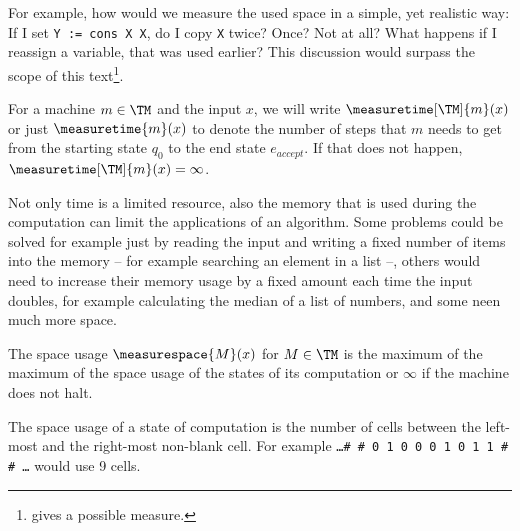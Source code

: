 For example, how would we measure the used space in a simple, yet realistic
way: If I set {\tt Y := cons X X}, do I copy {\tt X} twice? Once?  Not at all?
What happens if I reassign a variable, that was used earlier?  This discussion
would surpass the scope of this text\footnote{\cite[p. 325f]{jones} gives a
possible measure.}.

\begin{defn}
	For a machine $m\in \TM$ and the input $x$, we will write 
	$\measuretime[\TM]{m}(x)$ or just $\measuretime{m}(x)$ to denote the number 
	of steps that $m$ needs to get from the starting state $q_0$ to the end state 
	$e_{accept}$. If that does not happen, $\measuretime[\TM]{m}(x)=\infty$.
\end{defn}


Not only time is a limited resource, also the memory that is used during the 
computation can limit the applications of an algorithm. Some problems could 
be solved for example just by reading the input and writing a fixed number of 
items into the memory -- for example searching an element in a list --, others
would need to increase their memory usage by a fixed amount each time the 
input doubles, for example calculating the median of a list of numbers, and 
some neen much more space.


\begin{defn}
	The space usage $\measurespace{M}(x)$ for $M\in \TM$ is the maximum of the 
	maximum of the space usage of the states of its computation or $\infty$ if 
	the machine does not halt.

	The space usage of a state of computation is the number of cells between the 
	left-most and the right-most non-blank cell. For example {\tt \dots \# \# 0 1 
	0 0 0 1 0 1 1 \# \# \dots} would use 9 cells.
\end{defn}


